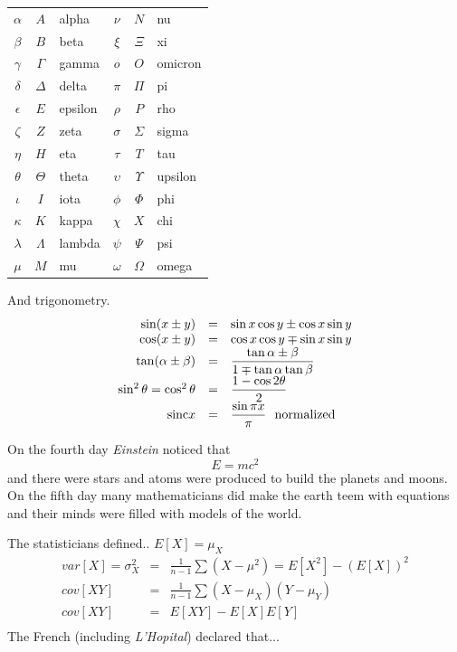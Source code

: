 \documentclass[a4paper,12pt]{article}
\newcommand{\sinc}{{\rm sinc}}
\begin{document}
\begin{multicols}{2}
\begin{tabular}{cclccl}
$\alpha $&$ A $& alpha&$\nu $&$ N $& nu\\
$\beta $&$ B $& beta&$\xi$&$\Xi$& xi\\
$\gamma $&$ \Gamma $& gamma&$o $&$ O $& omicron\\
$\delta $&$ \Delta $& delta&$\pi $&$ \Pi $& pi\\
$\epsilon $&$ E $& epsilon&$\rho $&$ P $& rho\\
$\zeta $&$ Z $& zeta&$\sigma $&$ \Sigma $& sigma\\
$\eta $&$ H $& eta&$\tau $&$ T $& tau\\
$\theta $&$ \Theta $& theta&$\upsilon $&$ \Upsilon $&upsilon\\
$\iota $&$ I $& iota&$\phi $&$ \Phi $&phi\\
$\kappa $&$ K $& kappa&$\chi $&$ X $& chi\\
$\lambda $&$ \Lambda $& lambda&$\psi $&$ \Psi $& psi\\
$\mu $&$ M $& mu&$\omega $&$ \Omega $& omega\\
\end{tabular}
\vfill
\columnbreak
And trigonometry.
\[
\begin{array}{rcl}
\sin(x\pm y)&= &\sin x\cos y \pm \cos x \sin y\\ 
\cos(x\pm y)&= &\cos x \cos y \mp \sin x \sin y\\
\tan(\alpha \pm \beta)&=&\dfrac{\tan\alpha\pm\beta}{1\mp\tan\alpha\tan\beta}\\
\sin^2\theta = \cos^2\theta&=& \dfrac{1-\cos 2\theta}{2}\\
\sinc x&=&\dfrac{\sin\pi x}{\pi} \mbox{ \ normalized}\\
\end{array}
\]
\vfill

On the fourth day \emph{Einstein} noticed that
\[ E=mc^2 \]
and there were stars and atoms were produced to build the planets and moons.
\vfill
On the fifth day many mathematicians did make the earth teem with equations and
their minds were filled with models of the world.

\vfill
The statisticians defined.. $E[X]=\mu_X$
\[
\begin{array}{rcl}
var[X]=\sigma_X^2&=&\frac{1}{n-1}\sum (X-\mu^2)=E[X^2]-(E[X])^2\\
cov[XY]&=&\frac{1}{n-1}\sum(X-\mu_X)(Y-\mu_Y)\\
cov[XY]&=&E[XY]-E[X]E[Y]\\
\end{array}
\]
\vfill
The French (including \emph{L'Hopital}) declared that...


\end{multicols}
\end{document}
